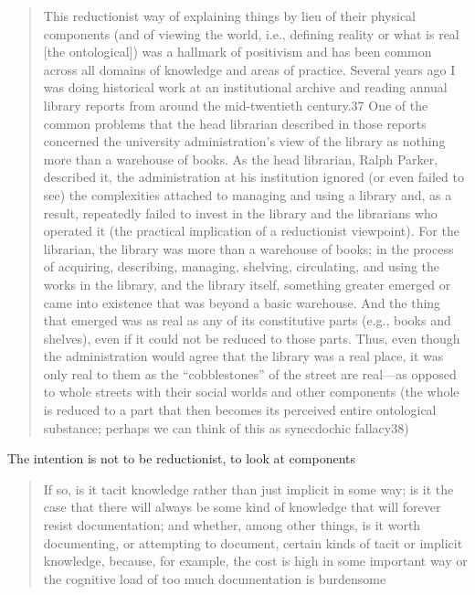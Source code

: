 \begin{quote}
    This reductionist way of explaining things by lieu of their physical components (and of
    viewing the world, i.e., defining reality or what is real [the ontological]) was a hallmark of
    positivism and has been common across all domains of knowledge and areas of practice. Several
    years ago I was doing historical work at an institutional archive and reading annual library
    reports from around the mid-twentieth century.37 One of the common problems that the head
    librarian described in those reports concerned the university administration’s view of the library
    as nothing more than a warehouse of books. As the head librarian, Ralph Parker, described it, the
    administration at his institution ignored (or even failed to see) the complexities attached to
    managing and using a library and, as a result, repeatedly failed to invest in the library and the
    librarians who operated it (the practical implication of a reductionist viewpoint). For the
    librarian, the library was more than a warehouse of books; in the process of acquiring,
    describing, managing, shelving, circulating, and using the works in the library, and the library
    itself, something greater emerged or came into existence that was beyond a basic warehouse.
    And the thing that emerged was as real as any of its constitutive parts (e.g., books and shelves),
    even if it could not be reduced to those parts. Thus, even though the administration would agree
    that the library was a real place, it was only real to them as the “cobblestones” of the street are
    real—as opposed to whole streets with their social worlds and other components (the whole is
    reduced to a part that then becomes its perceived entire ontological substance; perhaps we can
    think of this as synecdochic fallacy38)
\end{quote}


The intention is not to be reductionist, to look at components


\begin{quote}
    If so, is it tacit
    knowledge rather than just implicit in some way; is it the case that there will always be some
    kind of knowledge that will forever resist documentation; and whether, among other things, is it
    worth documenting, or attempting to document, certain kinds of tacit or implicit knowledge,
    because, for example, the cost is high in some important way or the cognitive load of too much
    documentation is burdensome
\end{quote}

